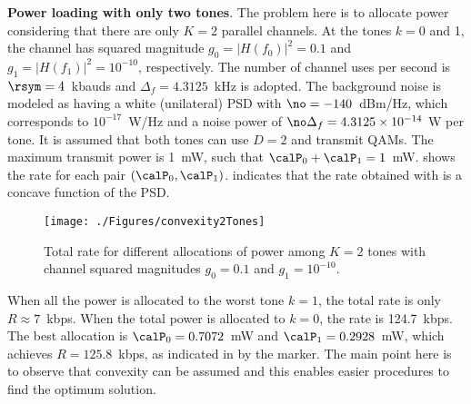 \bExample \textbf{Power loading with only two tones}.
\label{ex:waterfilling_two_tones}
The problem here is to allocate power considering that there are only $K=2$ parallel channels. 
At the tones $k=0$ and 1, the channel has squared magnitude $g_0=|H(f_0)|^2=0.1$ and $g_1=|H(f_1)|^2=10^{-10}$, respectively. The number of channel uses per second is $\rsym=4$~kbauds and $\Delta_f=4.3125$~kHz is adopted. The background noise is modeled as having a white (unilateral) PSD with $\no = -140$~dBm/Hz, which corresponds to $10^{-17}$~W/Hz and a noise power of $\no \Delta_f = 4.3125 \times 10^{-14}$ W per tone. It is assumed that both tones can use $D=2$ and transmit QAMs. The maximum transmit power is 1~mW, such that $\calP_0 + \calP_1 = 1$~mW.
 shows the rate for each pair $(\calP_0, \calP_1)$.
 indicates that the rate obtained with  is a concave function of the PSD.


\begin{figure}
\centering
\texttt{[image: ./Figures/convexity2Tones]}
\caption{Total rate for different allocations of power among $K=2$ tones with channel squared magnitudes $g_0=0.1$ and $g_1=10^{-10}$.}\label{fig:convexity2Tones}
\end{figure}

When all the power is allocated to the worst tone $k=1$, the total rate is only $R \approx 7$~kbps. When the total power is allocated to $k=0$, the rate is 124.7~kbps. The best allocation is $\calP_0 = 0.7072$~mW and $\calP_1 = 0.2928$~mW, which achieves $R=125.8$~kbps, as indicated in  by the marker. The main point here is to observe that convexity can be assumed and this enables easier procedures to find the optimum solution.
\eExample

